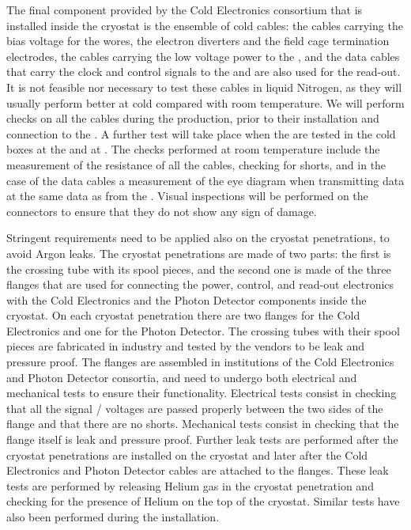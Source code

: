 The final component provided by the Cold Electronics consortium
that is installed inside the cryostat is the ensemble of cold
cables: the cables carrying the bias voltage for the 
wores, the electron diverters and the field cage termination electrodes,
the cables carrying the low voltage power to the ,
and the data cables that carry the clock and control signals
to the  and are also used for the read-out. It is not
feasible nor necessary to test these cables in liquid Nitrogen,
as they will usually perform better at cold compared with
room temperature. We will perform checks on all the cables 
during the production, prior to their installation and 
connection to the . A further test will take place
when the  are tested in the cold boxes at the 
and at \surf. The checks performed at room temperature include
the measurement of the resistance of all the cables, checking for
shorts, and in the case of the data cables a measurement of the
eye diagram when transmitting data at the same data as from the
. Visual inspections will be performed on the connectors
to ensure that they do not show any sign of damage.

Stringent requirements need to be applied also on the cryostat
penetrations, to avoid Argon leaks. The cryostat penetrations are
made of two parts: the first is the crossing tube with its spool pieces,
and the second one is made of the three flanges that are used for
connecting the power, control, and read-out electronics with the
Cold Electronics and the Photon Detector components inside the
cryostat. On each cryostat penetration there are two flanges for
the Cold Electronics and one for the Photon Detector. The crossing
tubes with their spool pieces are fabricated in industry and tested
by the vendors to be leak and pressure proof. The flanges are assembled
in institutions of the Cold Electronics and Photon Detector consortia,
and need to undergo both electrical and mechanical tests to ensure their
functionality. Electrical tests consist in checking that all the
signal / voltages are passed properly between the two sides of the
flange and that there are no shorts. Mechanical tests consist in 
checking that the flange itself is leak and pressure proof. Further
leak tests are performed after the cryostat penetrations are installed
on the cryostat and later after the Cold Electronics and Photon
Detector cables are attached to the flanges. These leak tests are
performed by releasing Helium gas in the cryostat penetration and
checking for the presence of Helium on the top of the cryostat. Similar
tests have also been performed during the  installation.

